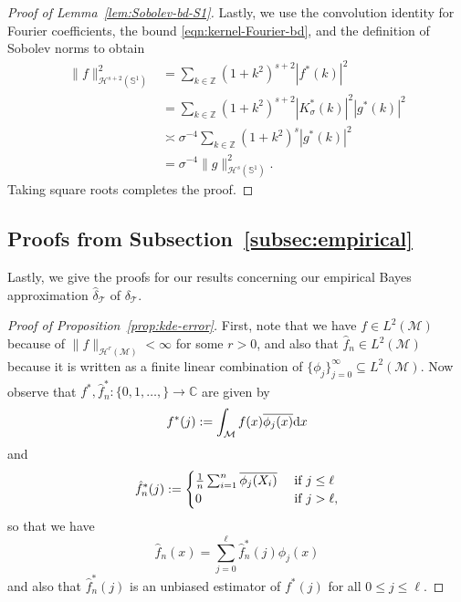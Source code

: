 \documentclass[preprint]{imsart}
\theoremstyle{plain}
\theoremstyle{definition}
\newcommand{\Zbb}{\mathbb{Z}}
\newcommand{\Cbb}{\mathbb{C}}
\newcommand{\Mcal}{\mathcal{M}}
\newcommand{\Hcal}{\mathcal{H}}
\newcommand{\diff}{\textnormal{d}}
\newcommand{\T}{\mathcal{T}}
\begin{document}
\begin{appendix}
\begin{proof}[Proof of Lemma~\ref{lem:Sobolev-bd-S1}]
Lastly, we use the convolution identity for Fourier coefficients, the bound
\eqref{eqn:kernel-Fourier-bd}, and the definition of Sobolev norms to obtain
\begin{align*}
\|f\|_{\Hcal^{s+2}(\mathbb{S}^1)}^2
&=
\sum_{k\in\Zbb}(1+k^2)^{s+2}|f^{\ast}(k)|^2 \\
&=
\sum_{k\in\Zbb}(1+k^2)^{s+2}|K_{\sigma}^{\ast}(k)|^2|g^{\ast}(k)|^2 \\
&\asymp
\sigma^{-4}
\sum_{k\in\Zbb}(1+k^2)^{s}|g^{\ast}(k)|^2 \\
&=
\sigma^{-4}\|g\|_{\Hcal^s(\mathbb{S}^1)}^2.
\end{align*}
Taking square roots completes the proof.
\end{proof}


\subsection{Proofs from Subsection~\ref{subsec:empirical}}\label{subsec:proofs-empirical}

Lastly, we give the proofs for our results concerning our empirical Bayes approximation $\hat{\delta}_{\T}$ of $\delta_{\T}$.

\begin{proof}[Proof of Proposition~\ref{prop:kde-error}]    First, note that we have $f\in L^2(\Mcal)$ because of $\|f\|_{\Hcal^r(\Mcal)}<\infty$ for some $r>0$, and also that  $\hat{f}_n\in L^2(\Mcal)$ because it is written as a finite linear combination of $\{\phi_j\}_{j=0}^{\infty}\subseteq L^2(\Mcal)$.
Now observe that $f^{\ast},\hat{f}_n^{\ast}:\{0,1,\ldots,\}\to\Cbb$ are given by 
    \begin{equation*}
        f^{\ast}(j):= \int_{\Mcal}f(x)\overline{\phi_j(x)}\diff x
    \end{equation*}
    and
    \begin{equation*}
        \hat{f}_n^{\ast}(j):=\begin{cases}
            \frac{1}{n}\sum_{i=1}^{n}\overline{\phi_j(X_i)} &\textnormal{ if } j\le \ell \\
            0 &\textnormal{ if } j> \ell,
        \end{cases}
    \end{equation*}
    so that we have
    \begin{equation*}
        \hat f_n(x)=\sum_{j=0}^{\ell}\hat f_n^{\ast}(j)\phi_j(x)
    \end{equation*}
    and also that $\hat{f}_n^{\ast}(j)$ is an unbiased estimator of $f^{\ast}(j)$ for all $0\le j\le \ell$.


\end{proof}
\end{appendix}
\end{document}
